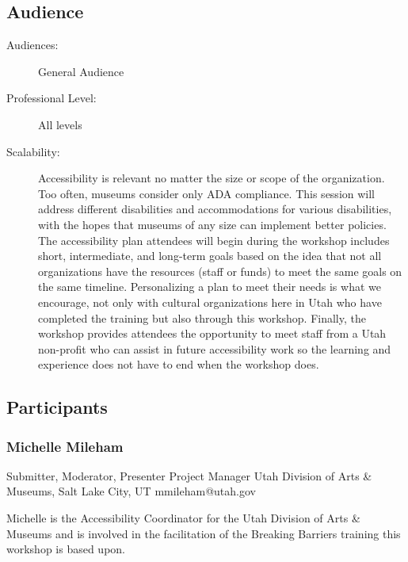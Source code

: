 \documentclass{report}
\begin{document}
              \subsection*{Audience}
                \begin{description}
                  \item [Audiences:]General Audience~
                  \item[Professional Level:]All levels~
                \item[Scalability:] Accessibility is relevant no matter the size or scope of the organization. Too often, museums consider only ADA compliance. This session will address different disabilities and accommodations for various disabilities, with the hopes that museums of any size can implement better policies. The accessibility plan attendees will begin during the workshop includes short, intermediate, and long-term goals based on the idea that not all organizations have the resources (staff or funds) to meet the same goals on the same timeline. Personalizing a plan to meet their needs is what we encourage, not only with cultural organizations here in Utah who have completed the training but also through this workshop. Finally, the workshop provides attendees the opportunity to meet staff from a Utah non-profit who can assist in future accessibility work so the learning and experience does not have to end when the workshop does.

							
              \end{description}
            \subsection*{Participants}
              \subsubsection*{ Michelle Mileham }
              Submitter, Moderator, Presenter\newline
              Project Manager\newline
              Utah Division of Arts \& Museums, Salt Lake City, UT
              \newline
              mmileham@utah.gov\newline
              
              

              Michelle is the Accessibility Coordinator for the Utah Division of Arts \& Museums and is involved in the facilitation of the Breaking Barriers training this workshop is based upon.\newline
\end{document}
